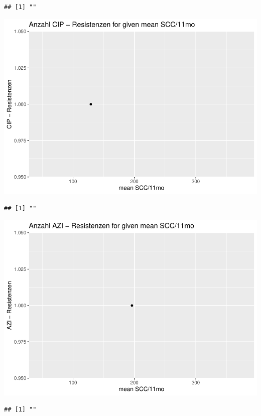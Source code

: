 \documentclass[
]{article}
\begin{document}
\begin{verbatim}
## [1] ""
\end{verbatim}

\includegraphics{NResistenzen_files/figure-latex/numerical_variables-12.pdf}

\begin{verbatim}
## [1] ""
\end{verbatim}

\includegraphics{NResistenzen_files/figure-latex/numerical_variables-13.pdf}

\begin{verbatim}
## [1] ""
\end{verbatim}
\end{document}
